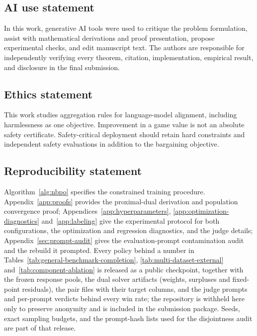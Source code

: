 \documentclass{article}
\theoremstyle{remark}
\theoremstyle{plain}
\begin{document}
\subsection*{AI use statement}
In this work, generative AI tools were used to critique the problem formulation, assist with mathematical derivations and proof presentation, propose experimental checks, and edit manuscript text. The authors are responsible for independently verifying every theorem, citation, implementation, empirical result, and disclosure in the final submission.

\subsection*{Ethics statement}
This work studies aggregation rules for language-model alignment, including harmlessness as one objective. Improvement in a game value is not an absolute safety certificate. Safety-critical deployment should retain hard constraints and independent safety evaluations in addition to the bargaining objective.

\subsection*{Reproducibility statement}
Algorithm~\ref{alg:nbpo} specifies the constrained training procedure. Appendix~\ref{app:proofs} provides the proximal-dual derivation and population convergence proof; Appendices~\ref{app:hyperparameters}, \ref{app:optimization-diagnostics} and~\ref{app:labeling} give the experimental protocol for both configurations, the optimization and regression diagnostics, and the judge details; Appendix~\ref{sec:prompt-audit} gives the evaluation-prompt contamination audit and the rebuild it prompted. Every policy behind a number in Tables~\ref{tab:general-benchmark-completion}, \ref{tab:multi-dataset-external} and~\ref{tab:component-ablation} is released as a public checkpoint, together with the frozen response pools, the dual solver artifacts (weights, surpluses and fixed-point residuals), the pair files with their target columns, and the judge prompts and per-prompt verdicts behind every win rate; the repository is withheld here only to preserve anonymity and is included in the submission package. Seeds, exact sampling budgets, and the prompt-hash lists used for the disjointness audit are part of that release.



\end{document}

